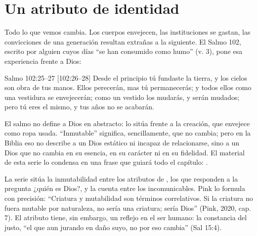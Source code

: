 
\section{Un atributo de identidad}

Todo lo que vemos cambia. Los cuerpos envejecen, las instituciones se gastan, las convicciones de una generación resultan extrañas a la siguiente. El Salmo 102, escrito por alguien cuyos días ``se han consumido como humo'' (v. 3), pone esa experiencia frente a Dios:

\begin{verso}{Salmo 102:25–27 [102:26–28]}
Desde el principio tú fundaste la tierra, y los cielos son obra de tus manos. Ellos perecerán, mas tú permanecerás; y todos ellos como una vestidura se envejecerán; como un vestido los mudarás, y serán mudados; pero tú eres el mismo, y tus años no se acabarán.
\end{verso}

El salmo no define a Dios en abstracto: lo sitúa frente a la creación, que envejece como ropa usada. ``Inmutable'' significa, sencillamente, que no cambia; pero en la Biblia eso no describe a un Dios estático ni incapaz de relacionarse, sino a un Dios que no cambia en su esencia, en su carácter ni en su fidelidad. El material de esta serie lo condensa en una frase que guiará todo el capítulo: .

La serie sitúa la inmutabilidad entre los atributos de , los que responden a la pregunta ¿quién es Dios?, y la cuenta entre los incomunicables. Pink lo formula con precisión: ``Criatura y mutabilidad son términos correlativos. Si la criatura no fuera mutable por naturaleza, no sería una criatura; sería Dios'' (Pink, 2020, cap. 7). El atributo tiene, sin embargo, un reflejo en el ser humano: la constancia del justo, ``el que aun jurando en daño suyo, no por eso cambia'' (Sal 15:4).


